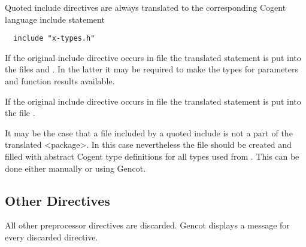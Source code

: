 Quoted include directives are always translated to the corresponding Cogent language include statement
\begin{verbatim}
  include "x-types.h"
\end{verbatim}
If the original include directive occurs in file  the translated statement is put into the files 
 and . In the latter it may be required to make the types for parameters and
function results available.

If the original include directive occurs in file  the translated statement is put into the file
. 

It may be the case that a file  included by a quoted include is not a part of the translated <package>. 
In this case nevertheless the file  should be created and filled with abstract Cogent type
definitions for all types used from . This can be done either manually or using Gencot.

\subsection{Other Directives}

All other preprocessor directives are discarded. Gencot displays a message for every discarded directive.

 
